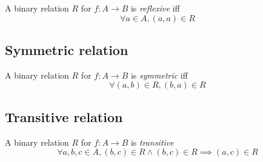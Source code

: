 \documentclass{article}
\begin{document}
A binary relation \(R\) for \(f:A\to B\) is \textit{reflexive}
iff
\[
    \forall a\in A, (a,a) \in R
\]

\subsection{Symmetric relation}

A binary relation \(R\) for \(f:A\to B\) is \textit{symmetric}
iff
\[
    \forall (a,b)\in R, (b,a) \in R
\]

\subsection{Transitive relation}

A binary relation \(R\) for \(f:A\to B\) is \textit{transitive}
\[
    \forall a,b,c \in A, (b,c) \in R \land (b,c) \in R \implies (a,c) \in R 
\]

\pagebreak
\end{document}
